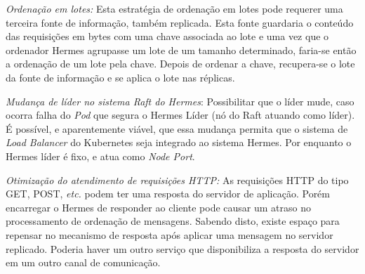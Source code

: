 \textit{Ordenação em lotes:} Esta estratégia de ordenação em lotes pode requerer uma terceira fonte de informação, também replicada. Esta fonte guardaria o conteúdo das requisições em bytes com uma chave associada ao lote e uma vez que o ordenador Hermes agrupasse um lote de um tamanho determinado, faria-se então a ordenação de um lote pela chave. Depois de ordenar a chave, recupera-se o lote da fonte de informação e se aplica o lote nas réplicas.

\textit{Mudança de líder no sistema Raft do Hermes}: Possibilitar que o líder mude, caso ocorra falha do \textit{Pod} que segura o Hermes Líder (nó do Raft atuando como líder). É possível, e aparentemente viável, que essa mudança permita que o sistema de \textit{Load Balancer} do Kubernetes seja integrado ao sistema Hermes. Por enquanto o Hermes líder é fixo, e atua como \textit{Node Port}.

\textit{Otimização do atendimento de requisições HTTP:} As requisições HTTP do tipo GET, POST, \textit{etc.} podem ter uma resposta do servidor de aplicação. Porém encarregar o Hermes de responder ao cliente pode causar um atraso no processamento de ordenação de mensagens. Sabendo disto, existe espaço para repensar no mecanismo de resposta após aplicar uma mensagem no servidor replicado. Poderia haver um outro serviço que disponibiliza a resposta do servidor em um outro canal de comunicação.
